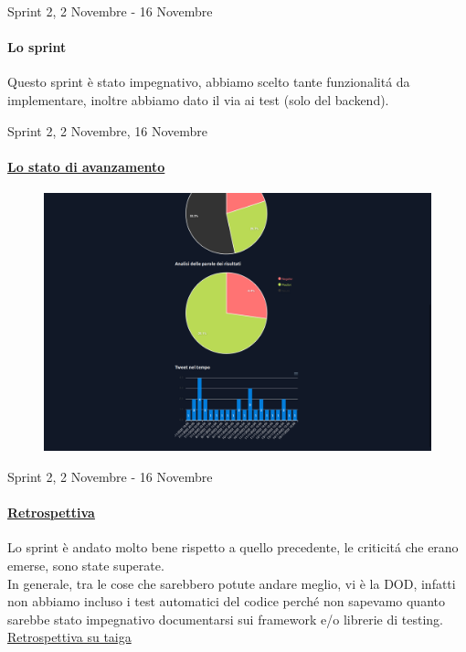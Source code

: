 \documentclass[12pt, aspectration=169]{beamer}
\begin{document}
\begin{frame}{Sprint 2, 2 Novembre - 16 Novembre}
\framesubtitle{Lo sprint}
Questo sprint \`e stato impegnativo, abbiamo scelto tante funzionalit\'a da implementare, inoltre abbiamo dato il via ai test (solo del backend).
\end{frame}
\begin{frame}{Sprint 2, 2 Novembre, 16 Novembre}
\framesubtitle{\href{https://taiga.hjkl.gq/project/ingsw2022-team3/wiki/sprint-rw-1511}{Lo stato di avanzamento}}
\begin{figure}[H]
    \centering
    \includegraphics[scale=0.15]{reviews/sprint_review1115.png}
    \label{fig:review2}
\end{figure}
\end{frame}
\begin{frame}{Sprint 2, 2 Novembre - 16 Novembre}
\framesubtitle{\href{https://taiga.hjkl.gq/project/ingsw2022-team3/wiki/retrospettiva-sprint-2}{Retrospettiva}}
Lo sprint \`e andato molto bene rispetto a quello precedente, le criticit\'a che erano emerse, sono state superate. \\
In generale, tra le cose che sarebbero potute andare meglio, vi \`e la DOD, infatti non abbiamo incluso i test automatici del codice perch\'e non sapevamo quanto sarebbe stato impegnativo documentarsi sui framework e/o librerie di testing. \\
\href{https://taiga.hjkl.gq/project/ingsw2022-team3/wiki/retrospettiva-sprint-2}{Retrospettiva su taiga}
\end{frame}
\end{document}
